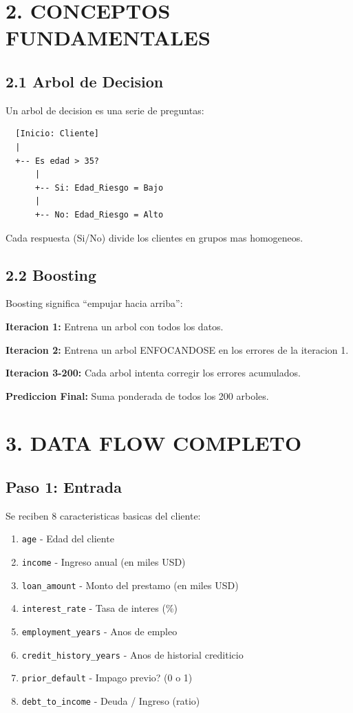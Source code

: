 \documentclass[11pt]{article}
\begin{document}
\section*{2. CONCEPTOS FUNDAMENTALES}

\subsection*{2.1 Arbol de Decision}

Un arbol de decision es una serie de preguntas:

\begin{verbatim}
  [Inicio: Cliente]
  |
  +-- Es edad > 35?
      |
      +-- Si: Edad_Riesgo = Bajo
      |
      +-- No: Edad_Riesgo = Alto
\end{verbatim}

Cada respuesta (Si/No) divide los clientes en grupos mas homogeneos.

\subsection*{2.2 Boosting}

Boosting significa ``empujar hacia arriba'':

\textbf{Iteracion 1:} Entrena un arbol con todos los datos.

\textbf{Iteracion 2:} Entrena un arbol ENFOCANDOSE en los errores de la iteracion 1.

\textbf{Iteracion 3-200:} Cada arbol intenta corregir los errores acumulados.

\textbf{Prediccion Final:} Suma ponderada de todos los 200 arboles.

\section*{3. DATA FLOW COMPLETO}

\subsection*{Paso 1: Entrada}

Se reciben 8 caracteristicas basicas del cliente:
\begin{enumerate}
\item \texttt{age} - Edad del cliente
\item \texttt{income} - Ingreso anual (en miles USD)
\item \texttt{loan\_amount} - Monto del prestamo (en miles USD)
\item \texttt{interest\_rate} - Tasa de interes (\%)
\item \texttt{employment\_years} - Anos de empleo
\item \texttt{credit\_history\_years} - Anos de historial crediticio
\item \texttt{prior\_default} - Impago previo? (0 o 1)
\item \texttt{debt\_to\_income} - Deuda / Ingreso (ratio)
\end{enumerate}
\end{document}
